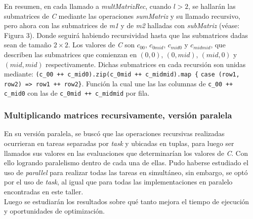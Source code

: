 \documentclass{article}
\begin{document}
En resumen, en cada llamado a \textit{multMatrizRec}, cuando \(l > 2\), se hallarán las submatrices de \textit{C} mediante las operaciones \textit{sumMatriz} y su llamado recursivo, pero ahora con las submatrices de \textit{m1} y de \textit{m2} halladas con \textit{subMatriz} (véase: Figura 3). Donde seguirá habiendo recursividad hasta que las submatrices dadas sean de tamaño \(2 \times 2\). Los valores de \textit{C} son \(c_{00}\), \(c_{0mid}\), \(c_{mid0}\) y \(c_{midmid}\), que describen las submatrices que comienzan en \((0,0)\), \((0,mid)\), \((mid,0)\) y \((mid,mid)\) respectivamente. Dichas submatrices en cada recursión son unidas mediante: \verb|(c_00 ++ c_mid0).zip(c_0mid ++ c_midmid).map {| \verb|case (row1, row2) => row1 ++ row2}|. Función la cual une las las columnas de \verb|c_00 ++ c_mid0| con las de \verb|c_0mid ++ c_midmid| por fila.

\subsubsection{Multiplicando matrices recursivamente, versión paralela}

En su versión paralela, se buscó que las operaciones recursivas realizadas ocurrieran en tareas separadas por \textit{task} y ubicadas en tuplas, para luego ser llamados sus valores en las evaluaciones que determinarían los valores de \textit{C}. Con ello logrando paralelismo dentro de cada una de ellas. Pudo haberse estudiado el uso de \textit{parallel} para realizar todas las tareas en simultáneo, sin embargo, se optó por el uso de \textit{task}, al igual que para todas las implementaciones en paralelo encontradas en este taller.\\

Luego se estudiarán los resultados sobre qué tanto mejora el tiempo de ejecución y oportunidades de optimización. \\
\end{document}
